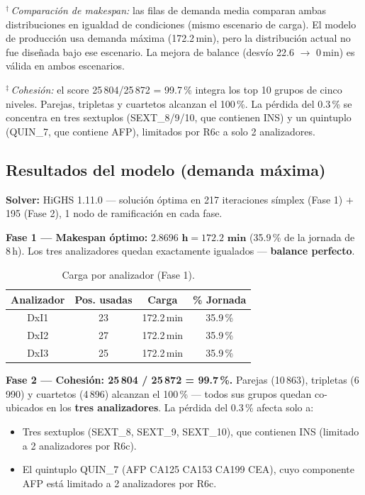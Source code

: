 \documentclass[12pt, a4paper]{article}
\begin{document}
\begin{small}
$^\dagger$\,\textit{Comparación de makespan:} las filas de demanda media comparan ambas
distribuciones en igualdad de condiciones (mismo escenario de carga). El modelo de
producción usa demanda máxima (172.2\,min), pero la distribución actual no fue diseñada
bajo ese escenario. La mejora de balance (desvío 22.6 $\to$ 0\,min) es válida en ambos
escenarios.

$^\ddagger$\,\textit{Cohesión:} el score 25\,804/25\,872 = 99.7\,\% integra los top 10
grupos de cinco niveles. Parejas, tripletas y cuartetos alcanzan el 100\,\%. La pérdida
del 0.3\,\% se concentra en tres sextuplos (SEXT\_8/9/10, que contienen INS) y un
quintuplo (QUIN\_7, que contiene AFP), limitados por R6c a solo 2 analizadores.
\end{small}

\subsection{Resultados del modelo (demanda máxima)}

\textbf{Solver:} HiGHS 1.11.0 --- solución óptima en 217 iteraciones símplex (Fase 1)
$+$ 195 (Fase 2), 1 nodo de ramificación en cada fase.

\medskip
\textbf{Fase 1 — Makespan óptimo:} $\mathbf{2.8696\text{ h} = 172.2\text{ min}}$
(35.9\,\% de la jornada de 8\,h). Los tres analizadores quedan exactamente igualados ---
\textbf{balance perfecto}.

\begin{table}[H]
\centering
\caption{Carga por analizador (Fase 1).}
\begin{tabular}{cccc}
\toprule
\textbf{Analizador} & \textbf{Pos. usadas} & \textbf{Carga} & \textbf{\% Jornada} \\
\midrule
DxI1 & 23 & 172.2\,min & 35.9\,\% \\
DxI2 & 27 & 172.2\,min & 35.9\,\% \\
DxI3 & 25 & 172.2\,min & 35.9\,\% \\
\bottomrule
\end{tabular}
\end{table}

\textbf{Fase 2 — Cohesión: 25\,804 / 25\,872 = 99.7\,\%.}
Parejas (10\,863), tripletas (6\,990) y cuartetos (4\,896) alcanzan el 100\,\% --- todos
sus grupos quedan co-ubicados en los \textbf{tres analizadores}. La pérdida del 0.3\,\%
afecta solo a:
\begin{itemize}
  \item Tres sextuplos (SEXT\_8, SEXT\_9, SEXT\_10), que contienen INS (limitado a 2
        analizadores por R6c).
  \item El quintuplo QUIN\_7 (AFP CA125 CA153 CA199 CEA), cuyo componente AFP está
        limitado a 2 analizadores por R6c.
\end{itemize}
\end{document}
